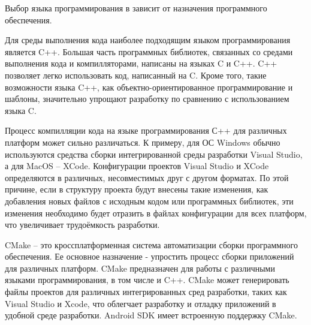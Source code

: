 Выбор языка программирования в зависит от назначения программного обеспечения.

Для среды выполнения кода наиболее подходящим языком программирования является C++.
Большая часть программных библиотек, связанных со средами выполнения кода и компилляторами, написаны на языках C и C++.
C++ позволяет легко использовать код, написанный на C.
Кроме того, такие возможности языка C++, как объектно-ориентированное программирование и шаблоны, значительно упрощают разработку по сравнению с использованием языка C.

Процесс компилляции кода на языке программирования С++ для различных платформ может сильно различаться.
К примеру, для ОС Windows обычно используются средства сборки интегрированной среды разработки Visual Studio, а для MacOS -- XCode.
Конфигурации проектов Visual Studio и XCode определяются в различных, несовместимых друг с другом форматах.
По этой причине, если в структуру проекта будут внесены такие изменения, как добавления новых файлов с исходным кодом или программных библиотек, эти изменения необходимо будет отразить в файлах конфигурации для всех платформ, что увеличивает трудоёмкость разработки.

CMake -- это кроссплатформенная система автоматизации сборки программного обеспечения. Ее основное назначение - упростить процесс сборки приложений для различных платформ. 
CMake предназначен для работы с различными языками программирования, в том числе и C++.
CMake может генерировать файлы проектов для различных интегрированных сред разработки, таких как Visual Studio и Xcode, что облегчает разработку и отладку приложений в удобной среде разработки.
Android SDK имеет встроенную поддержку CMake.

